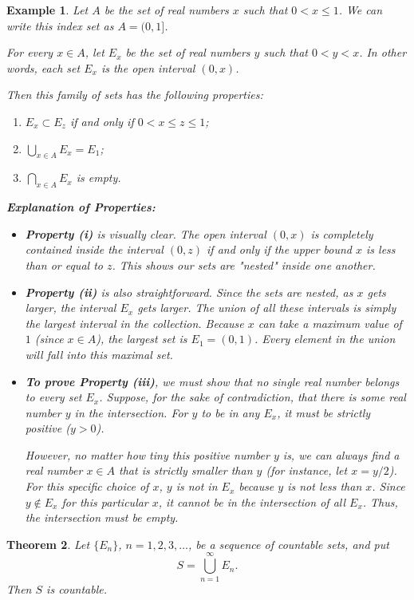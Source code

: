 \documentclass{article}
\theoremstyle{mythm}
\newtheorem{theorem}{Theorem}[section]
\newtheorem{example}[theorem]{Example}
\begin{document}
\begin{example}
Let $A$ be the set of real numbers $x$ such that $0 < x \le 1$. We can write this index set as $A = (0, 1]$. 

For every $x \in A$, let $E_x$ be the set of real numbers $y$ such that $0 < y < x$. In other words, each set $E_x$ is the open interval $(0, x)$. 

Then this family of sets has the following properties:
\begin{enumerate}[label=(\roman*)]
    \item $E_x \subset E_z$ if and only if $0 < x \le z \le 1$;
    \item $\displaystyle\bigcup_{x \in A} E_x = E_1$;
    \item $\displaystyle\bigcap_{x \in A} E_x$ is empty.
\end{enumerate}

\textbf{Explanation of Properties:}
\begin{itemize}
    \item \textbf{Property (i)} is visually clear. The open interval $(0, x)$ is completely contained inside the interval $(0, z)$ if and only if the upper bound $x$ is less than or equal to $z$. This shows our sets are "nested" inside one another.
    
    \item \textbf{Property (ii)} is also straightforward. Since the sets are nested, as $x$ gets larger, the interval $E_x$ gets larger. The union of all these intervals is simply the largest interval in the collection. Because $x$ can take a maximum value of $1$ (since $x \in A$), the largest set is $E_1 = (0, 1)$. Every element in the union will fall into this maximal set.
    
    \item \textbf{To prove Property (iii)}, we must show that no single real number belongs to \textit{every} set $E_x$. Suppose, for the sake of contradiction, that there is some real number $y$ in the intersection. For $y$ to be in any $E_x$, it must be strictly positive ($y > 0$). 
    
    However, no matter how tiny this positive number $y$ is, we can always find a real number $x \in A$ that is strictly smaller than $y$ (for instance, let $x = y/2$). For this specific choice of $x$, $y$ is not in $E_x$ because $y$ is not less than $x$. Since $y \notin E_x$ for this particular $x$, it cannot be in the intersection of \textit{all} $E_x$. Thus, the intersection must be empty.
\end{itemize}
\end{example}
\begin{theorem}
Let $\{E_n\}$, $n = 1, 2, 3, \dots$, be a sequence of countable sets, and put
\[
S = \bigcup_{n=1}^\infty E_n.
\]
Then $S$ is countable.
\end{theorem}
\end{document}
